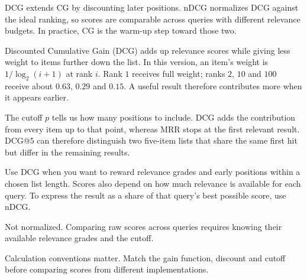 \metricsecondary

DCG extends CG by discounting later positions. nDCG normalizes DCG against the ideal ranking, so scores are comparable across queries with different relevance budgets. In practice, CG is the warm-up step toward those two.

\metricend
\clearpage
\thispagestyle{rankingstyle}
\label{sec:dcg}

Discounted Cumulative Gain (DCG) adds up relevance scores while giving less weight to items further down the list. In this version, an item's weight is $1/\log_2(i+1)$ at rank $i$. Rank $1$ receives full weight; ranks $2$, $10$ and $100$ receive about $0.63$, $0.29$ and $0.15$. A useful result therefore contributes more when it appears earlier.

\begin{metricformula}
\end{metricformula}

The cutoff $p$ tells us how many positions to include. DCG adds the contribution from every item up to that point, whereas MRR stops at the first relevant result. DCG@$5$ can therefore distinguish two five-item lists that share the same first hit but differ in the remaining results.


Use DCG when you want to reward relevance grades and early positions within a chosen list length. Scores also depend on how much relevance is available for each query. To express the result as a share of that query's best possible score, use nDCG.

{
    \item Not normalized. Comparing raw scores across queries requires knowing their available relevance grades and the cutoff.
    \item Calculation conventions matter. Match the gain function, discount and cutoff before comparing scores from different implementations.
}

